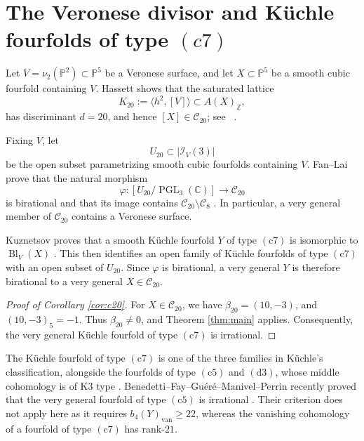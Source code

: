 \documentclass[10pt]{amsart}
\numberwithin{equation}{section}
\theoremstyle{definition}
\theoremstyle{plain}
\numberwithin{theorem}{section}
\def\CC{{\mathbb{C}}}
\def\PP{{\mathbb{P}}}
\DeclareMathOperator{\Bl}{Bl}
\newcommand{\Z}{\mathbb{Z}}
\begin{document}
\section{The Veronese divisor and K\"uchle fourfolds of type $(c7)$}\label{sec:veronese}
Let $V=\nu_2(\PP^2)\subset\PP^5$ be a Veronese surface, and let
$X\subset\PP^5$ be a smooth cubic fourfold containing $V$.
Hassett shows that the saturated lattice
\[
K_{20}:=\langle h^2,[V]\rangle\subset A(X)_{\Z},
\]
has discriminant $d=20$, and hence $[X]\in\mathcal C_{20}$; see ~\cite[Example~4.1.4]{hassett}. 

Fixing $V$, let
\[
U_{20}\subset|\mathcal I_V(3)|
\]
be the open subset parametrizing smooth cubic fourfolds containing $V$.
Fan--Lai prove that the natural morphism
\[
\varphi\colon
[U_{20}/\operatorname{PGL}_3(\CC)]
\longrightarrow\mathcal C_{20}
\]
is birational and that its image contains
$\mathcal C_{20}\setminus\mathcal C_8$
\cite[Proposition~2.1]{Fan2020NewRC}. In particular, a very general
member of $\mathcal C_{20}$ contains a Veronese surface.

Kuznetsov proves that a smooth K\"uchle fourfold $Y$ of type
$(\mathrm{c7})$ is isomorphic to $\Bl_V(X)$
\cite[Corollary~4.11]{Kuznetsov2015OnKV}. This then identifies
an open family of K\"uchle fourfolds of type $(\mathrm{c7})$ with an
open subset of $U_{20}$. Since $\varphi$ is birational, a very general
$Y$ is therefore birational to a very general
$X\in\mathcal C_{20}$.


\begin{proof}[Proof of Corollary \textup{\ref{cor:c20}}]
For $X\in\mathcal C_{20}$, we have $\beta_{20}=(10,-3)$, and $(10,-3)_5=-1$. Thus $\beta_{20}\neq0$, and Theorem \ref{thm:main} applies. Consequently, the very general K\"uchle fourfold of type $(\mathrm{c7})$ is irrational.\end{proof}

The K\"uchle fourfold of type $(\mathrm{c7})$ is one of the
three families in K\"uchle's classification, alongside the fourfolds of type $(\mathrm{c5})$ and $(\mathrm{d3})$, whose middle cohomology is of
K3 type \cite[Theorem~3.1]{kuchle}. Benedetti--Fay--Gu\'er\'e--Manivel--Perrin recently proved that the very general fourfold of type $(\mathrm{c5})$ is irrational
\cite[Theorem~4.1]{c5}. Their criterion does not apply here as it requires $b_4(Y)_{\mathrm{van}}\geq22$, whereas
the vanishing cohomology of a fourfold of type $(\mathrm{c7})$ has rank-$21$.
\end{document}
